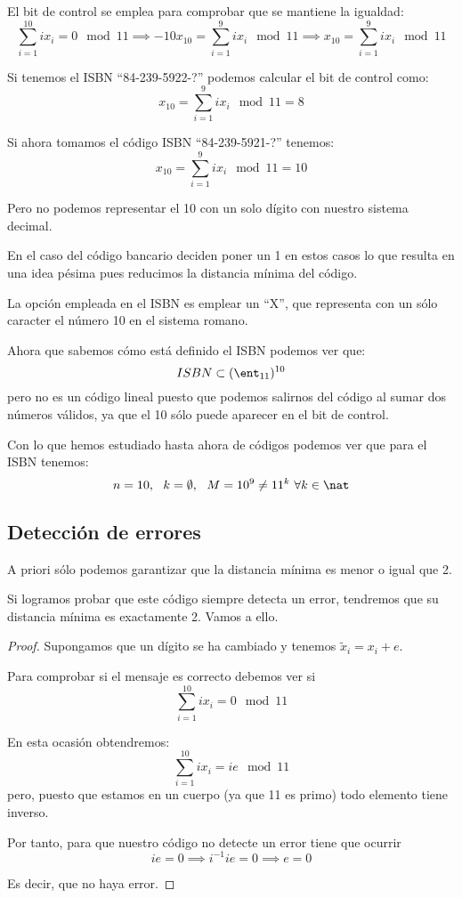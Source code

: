 El bit de control se emplea para comprobar que se mantiene la igualdad:
\[\sum_{i=1}^{10}ix_i = 0 \mod 11 \implies -10 x_{10} = \sum_{i=1}^9ix_i \mod 11 \implies x_{10} = \sum_{i=1}^9ix_i \mod 11\]


\begin{example}
Si tenemos el ISBN ``84-239-5922-?'' podemos calcular el bit de control como:
\[x_{10} = \sum_{i=1}^9ix_i \mod 11 = 8\]

Si ahora tomamos el código ISBN ``84-239-5921-?'' tenemos:
\[x_{10} = \sum_{i=1}^9ix_i \mod 11 = 10\]
\end{example}

Pero no podemos representar el 10 con un solo dígito con nuestro sistema decimal.

En el caso del código bancario deciden poner un 1 en estos casos lo que resulta en una idea pésima pues reducimos la distancia mínima del código.

La opción empleada en el ISBN es emplear un ``X'', que representa con un sólo caracter el número 10 en el sistema romano.

Ahora que sabemos cómo está definido el ISBN podemos ver que:
\[ISBN \subset (\ent_{11})^{10}\]
pero no es un código lineal puesto que podemos salirnos del código al sumar dos números válidos, ya que el 10 sólo puede aparecer en el bit de control.

Con lo que hemos estudiado hasta ahora de códigos podemos ver que para el ISBN tenemos:
\[n=10, \ \ k=\emptyset, \ \ M = 10^{9}\neq 11^k \ \forall k \in \nat\]

\subsection{Detección de errores}

A priori sólo podemos garantizar que la distancia mínima es menor o igual que 2.

Si logramos probar que este código siempre detecta un error, tendremos que su distancia mínima es exactamente 2. Vamos a ello.
\begin{proof}
Supongamos que un dígito se ha cambiado y tenemos $\tilde{x}_i= x_i +e$.

Para comprobar si el mensaje es correcto debemos ver si
\[\sum_{i=1}^{10}ix_i = 0 \mod 11\]

En esta ocasión obtendremos:
\[\sum_{i=1}^{10}ix_i = ie \mod 11\]
pero, puesto que estamos en un cuerpo (ya que 11 es primo) todo elemento tiene inverso.

Por tanto, para que nuestro código no detecte un error tiene que ocurrir
\[ie=0 \implies i^{-1}ie=0 \implies e=0\]

Es decir, que no haya error.
\end{proof}

